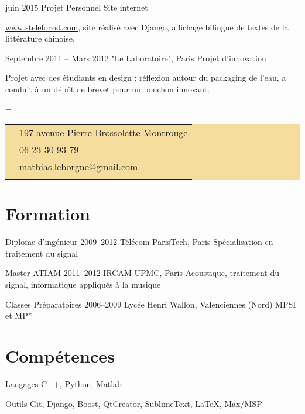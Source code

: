 \documentclass{tccv}
\renewcommand\personal[5][]{%
    \needspace{0.5\textheight}%
    \newdimen\boxwidth%
    \boxwidth=\dimexpr\linewidth-2\fboxsep\relax%
    \newlength\tailleImage%
    \settoheight\tailleImage{\texttt{[image: \#5]}}%
    \newlength\ex%
    \settoheight\ex{a}%
    \newlength\declg%
    \setlength\declg{0.5\tailleImage}%
    \addtolength\declg{-0.5\ex}%
    \colorbox[HTML]{F5DD9D}{%
    \begin{tabularx}{0.75\boxwidth}{c|X}%
    \Writinghand & {#2} \smallskip\\
    \Telefon     & {#3} \smallskip\\
    \Letter      & \href{mailto:#4}{#4}
    \ifstrempty{#1}{}{\smallskip\\ \Lightning & \href{http://#1}{#1}}
    \end{tabularx}%
    \raisebox{-\declg}{\texttt{[image: \#5]}}%
    }}
\begin{document}
\begin{eventlist}
\begin{eventlist}
\item{juin 2015}
     {Projet Personnel}
     {Site internet}

\textnormal{\url{www.steleforest.com}}, site réalisé avec Django, affichage bilingue de textes de la littérature chinoise. 


\item{Septembre 2011 -- Mars 2012}
    {"Le Laboratoire", Paris}
    {Projet d'innovation}
    
Projet avec des étudiants en design :
réflexion autour du packaging de l'eau, a conduit à un dépôt de brevet pour un bouchon innovant.


\end{eventlist}

\personal
    {197 avenue Pierre Brossolette 
     \newline 92120 Montrouge}
    {06 23 30 93 79}
    {mathias.leborgne@gmail.com}
    {selfie} %


\section{Formation}

\begin{yearlist}

\item[Diplome d'ingénieur]{2009--2012}
     {Télécom ParisTech, Paris}
     {Spécialisation en traitement du signal}

\item[Master ATIAM]{2011--2012}
    {IRCAM-UPMC, Paris}
    {Acoustique, traitement du signal, 
     informatique appliqués à la musique}

\item[Classes Préparatoires]{2006--2009}
    {Lycée Henri Wallon, Valenciennes (Nord)}
    {MPSI et MP*}

\end{yearlist}

\section{Compétences}

\begin{factlist}

\item{Langages}
     {C++, Python, Matlab}

\item{Outils}
     {Git, Django, Boost, QtCreator, SublimeText, \LaTeX, Max/MSP}


\end{factlist}
\end{eventlist}
\end{document}
